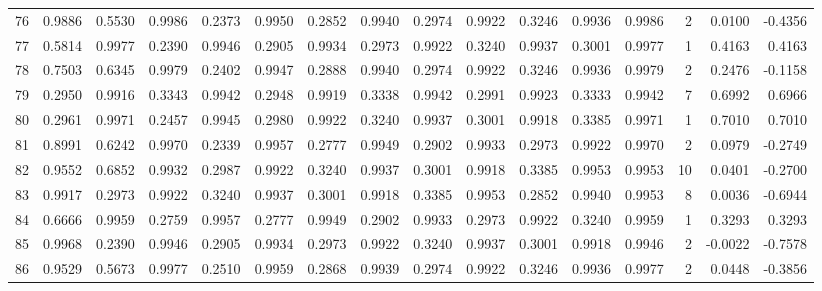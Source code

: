 \begin{tabular}{lrrrrrrrrrrrrrrr}
76  &      0.9886 &  0.5530 &  0.9986 &  0.2373 &  0.9950 &  0.2852 &  0.9940 &  0.2974 &  0.9922 &  0.3246 &   0.9936 &     0.9986 &      2 &                    0.0100 &                    -0.4356 \\
77  &      0.5814 &  0.9977 &  0.2390 &  0.9946 &  0.2905 &  0.9934 &  0.2973 &  0.9922 &  0.3240 &  0.9937 &   0.3001 &     0.9977 &      1 &                    0.4163 &                     0.4163 \\
78  &      0.7503 &  0.6345 &  0.9979 &  0.2402 &  0.9947 &  0.2888 &  0.9940 &  0.2974 &  0.9922 &  0.3246 &   0.9936 &     0.9979 &      2 &                    0.2476 &                    -0.1158 \\
79  &      0.2950 &  0.9916 &  0.3343 &  0.9942 &  0.2948 &  0.9919 &  0.3338 &  0.9942 &  0.2991 &  0.9923 &   0.3333 &     0.9942 &      7 &                    0.6992 &                     0.6966 \\
80  &      0.2961 &  0.9971 &  0.2457 &  0.9945 &  0.2980 &  0.9922 &  0.3240 &  0.9937 &  0.3001 &  0.9918 &   0.3385 &     0.9971 &      1 &                    0.7010 &                     0.7010 \\
81  &      0.8991 &  0.6242 &  0.9970 &  0.2339 &  0.9957 &  0.2777 &  0.9949 &  0.2902 &  0.9933 &  0.2973 &   0.9922 &     0.9970 &      2 &                    0.0979 &                    -0.2749 \\
82  &      0.9552 &  0.6852 &  0.9932 &  0.2987 &  0.9922 &  0.3240 &  0.9937 &  0.3001 &  0.9918 &  0.3385 &   0.9953 &     0.9953 &     10 &                    0.0401 &                    -0.2700 \\
83  &      0.9917 &  0.2973 &  0.9922 &  0.3240 &  0.9937 &  0.3001 &  0.9918 &  0.3385 &  0.9953 &  0.2852 &   0.9940 &     0.9953 &      8 &                    0.0036 &                    -0.6944 \\
84  &      0.6666 &  0.9959 &  0.2759 &  0.9957 &  0.2777 &  0.9949 &  0.2902 &  0.9933 &  0.2973 &  0.9922 &   0.3240 &     0.9959 &      1 &                    0.3293 &                     0.3293 \\
85  &      0.9968 &  0.2390 &  0.9946 &  0.2905 &  0.9934 &  0.2973 &  0.9922 &  0.3240 &  0.9937 &  0.3001 &   0.9918 &     0.9946 &      2 &                   -0.0022 &                    -0.7578 \\
86  &      0.9529 &  0.5673 &  0.9977 &  0.2510 &  0.9959 &  0.2868 &  0.9939 &  0.2974 &  0.9922 &  0.3246 &   0.9936 &     0.9977 &      2 &                    0.0448 &                    -0.3856 \\

\end{tabular}
